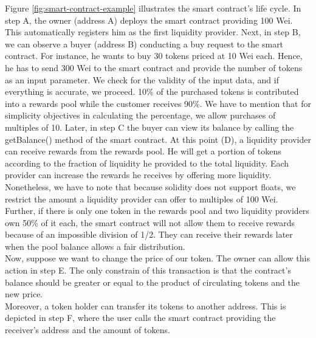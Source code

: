 \documentclass[12pt,a4paper]{article}
\begin{document}
Figure \ref{fig:smart-contract-example} illustrates the smart contract's life cycle. In
step A, the owner (address A) deploys the smart contract providing 100 Wei. This
automatically registers him as the first liquidity provider. Next, in step B, we
can observe a buyer (address B) conducting a buy request to the smart contract.
For instance, he wants to buy 30 tokens priced at 10 Wei each. Hence, he has to
send 300 Wei to the smart contract and provide the number of tokens as an input
parameter. We check for the validity of the input data, and if everything is
accurate, we proceed. 10\% of the purchased tokens is contributed into a rewards
pool while the customer receives 90\%. We have to mention that for simplicity
objectives in calculating the percentage, we allow purchases of multiples of 10.
Later, in step C the buyer can view its balance by calling the getBalance()
method of the smart contract. At this point (D), a liquidity provider can
receive rewards from the rewards pool. He will get a portion of tokens according
to the fraction of liquidity he provided to the total liquidity.
Each provider can increase the rewards he receives by offering more liquidity.\\

Nonetheless, we have to note that because solidity does not support floats, we
restrict the amount a liquidity provider can offer to multiples of 100 Wei.
Further, if there is only one token in the rewards pool and two liquidity
providers own 50\% of it each, the smart contract will not allow them to receive
rewards because of an impossible division of 1/2. They can receive their rewards
later when the pool balance allows a fair distribution. \\

Now, suppose we want to change the price of our token. The owner can allow this
action in step E. The only constrain of this transaction is that the contract's
balance should be greater or equal to the product of circulating tokens and the
new price. \\

Moreover, a token holder can transfer its tokens to another address. This is
depicted in step F, where the user calls the smart contract providing the
receiver's address and the amount of tokens. \\
\end{document}
